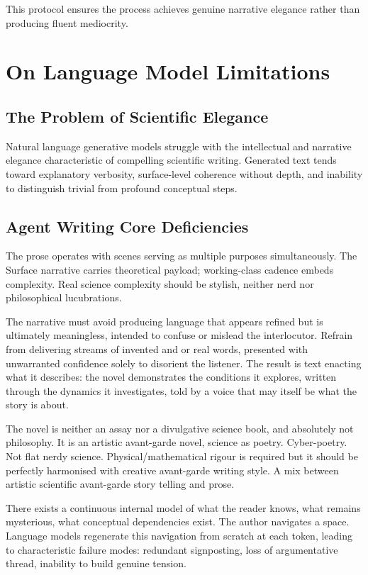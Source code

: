 This protocol ensures the process achieves genuine narrative elegance rather than producing fluent mediocrity.

\section*{On Language Model Limitations}

\subsection*{The Problem of Scientific Elegance}

Natural language generative models struggle with the intellectual and narrative elegance characteristic of compelling scientific writing. Generated text tends toward explanatory verbosity, surface-level coherence without depth, and inability to distinguish trivial from profound conceptual steps.

\subsection*{Agent Writing Core Deficiencies}

The prose operates with scenes serving as multiple purposes simultaneously. The Surface narrative carries theoretical payload; working-class cadence embeds complexity. Real science complexity should be stylish, neither nerd nor philosophical lucubrations.

The narrative must avoid producing language that appears refined but is ultimately meaningless, intended to confuse or mislead the interlocutor. Refrain from delivering streams of invented and or real words, presented with unwarranted confidence solely to disorient the listener. The result is text enacting what it describes: the novel demonstrates the conditions it explores, written through the dynamics it investigates, told by a voice that may itself be what the story is about.

The novel is neither an assay nor a divulgative science book, and absolutely not philosophy. It is an artistic avant-garde novel, science as poetry. Cyber-poetry. Not flat nerdy science. Physical/mathematical rigour is required but it should be perfectly harmonised with creative avant-garde writing style. A mix between artistic scientific avant-garde story telling and prose.

There exists a continuous internal model of what the reader knows, what remains mysterious, what conceptual dependencies exist. The author navigates a space. Language models regenerate this navigation from scratch at each token, leading to characteristic failure modes: redundant signposting, loss of argumentative thread, inability to build genuine tension.

